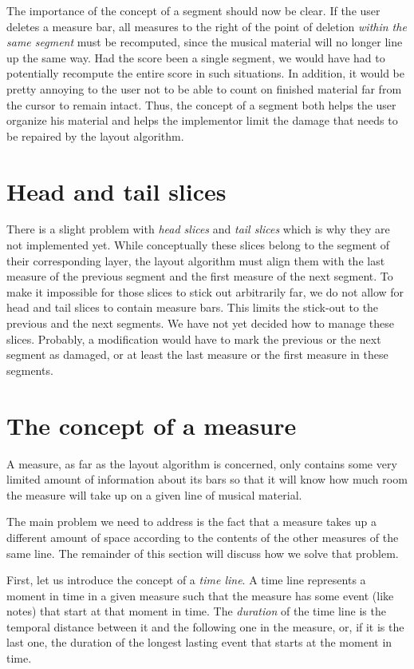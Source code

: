 \documentclass[11pt]{book}
\begin{document}
The importance of the concept of a segment should now be clear.
If the user deletes a measure bar, all measures to the right of the
point of deletion \emph{within the same segment} must be recomputed,
since the musical material will no longer line up the same way.  Had
the score been a single segment, we would have had to potentially
recompute the entire score in such situations.  In addition, it would
be pretty annoying to the user not to be able to count on finished
material far from the cursor to remain intact.  Thus, the concept of a
segment both helps the user organize his material and helps the
implementor limit the damage that needs to be repaired by the layout
algorithm. 

\section{Head and tail slices}

There is a slight problem with \emph{head slices} and \emph{tail
slices} which is why they are not implemented yet.  While
conceptually these slices belong to the segment of their
corresponding layer, the layout algorithm must align them with the
last measure of the previous segment and the first measure of the
next segment.  To make it impossible for those slices to stick out
arbitrarily far, we do not allow for head and tail slices to contain
measure bars.  This limits the stick-out to the previous and the
next segments.  We have not yet decided how to manage these slices.
Probably, a modification would have to mark the previous or the next
segment as damaged, or at least the last measure or the first measure
in these segments.  

\section{The concept of a measure}

A measure, as far as the layout algorithm is concerned, only contains
some very limited amount of information about its bars so that it will
know how much room the measure will take up on a given line of musical
material. 

The main problem we need to address is the fact that a measure takes
up a different amount of space according to the contents of the other
measures of the same line.  The remainder of this section will discuss
how we solve that problem.

First, let us introduce the concept of a \emph{time line}. A time line represents a moment in time in a given measure such
that the measure has some event (like notes) that start at that moment
in time.  The \emph{duration} of the
time line is the temporal distance between it and the following one in
the measure, or, if it is the last one, the duration of the longest
lasting event that starts at the moment in time. 
\end{document}

